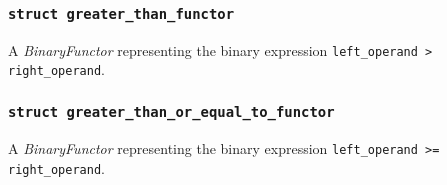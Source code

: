 \documentclass[oneside]{article}
\begin{document}
\subsubsection{\texttt{struct greater\_than\_functor}}
A \textit{BinaryFunctor} representing the binary expression \verb|left_operand > right_operand|.

\subsubsection{\texttt{struct greater\_than\_or\_equal\_to\_functor}}
A \textit{BinaryFunctor} representing the binary expression \verb|left_operand >= right_operand|.
\end{document}
